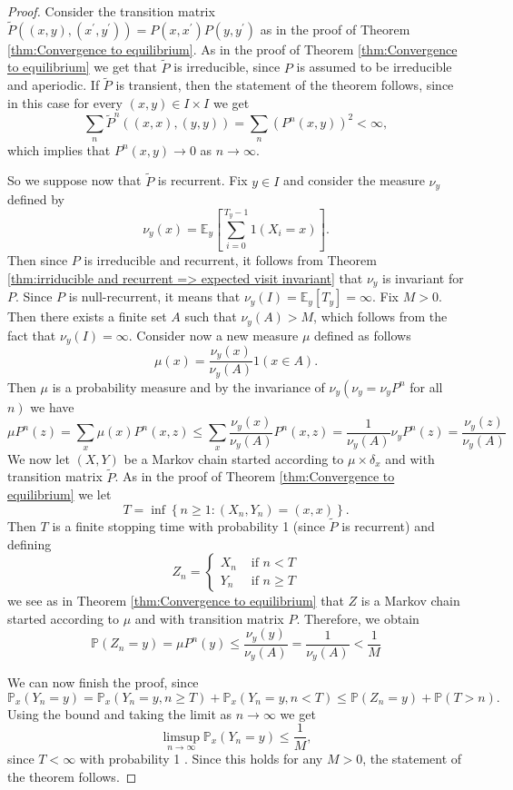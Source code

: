 \documentclass[a4paper,11pt]{article}
\begin{document}
\begin{proof}
    Consider the transition matrix $\widetilde{P}\left((x, y),\left(x^{\prime}, y^{\prime}\right)\right)=P\left(x, x^{\prime}\right) P\left(y, y^{\prime}\right)$ as in the proof of Theorem \ref{thm:Convergence to equilibrium}. As in the proof of Theorem \ref{thm:Convergence to equilibrium} we get that $\widetilde{P}$ is irreducible, since $P$ is assumed to be irreducible and aperiodic. If $\widetilde{P}$ is transient, then the statement of the theorem follows, since in this case for every $(x, y) \in I \times I$ we get
    \[
    \sum_n \widetilde{P}^n((x, x),(y, y))=\sum_n\left(P^n(x, y)\right)^2<\infty,
    \]
    which implies that $P^n(x, y) \rightarrow 0$ as $n \rightarrow \infty$.

    So we suppose now that $\widetilde{P}$ is recurrent. Fix $y \in I$ and consider the measure $\nu_y$ defined by
    \[
    \nu_y(x)=\mathbb{E}_y\left[\sum_{i=0}^{T_y-1} 1\left(X_i=x\right)\right] .
    \]
    Then since $P$ is irreducible and recurrent, it follows from Theorem \ref{thm:irriducible and recurrent => expected visit invariant} that $\nu_y$ is invariant for $P$. Since $P$ is null-recurrent, it means that $\nu_y(I)=\mathbb{E}_y\left[T_y\right]=\infty$. Fix $M>0$. Then there exists a finite set $A$ such that $\nu_y(A)>M$, which follows from the fact that $\nu_y(I)=\infty$. Consider now a new measure $\mu$ defined as follows
    \[
    \mu(x)=\frac{\nu_y(x)}{\nu_y(A)} 1(x \in A) .
    \]
    Then $\mu$ is a probability measure and by the invariance of $\nu_y\left(\nu_y=\nu_y P^n\right.$ for all $\left.n\right)$ we have
    \[
    \mu P^n(z)=\sum_x \mu(x) P^n(x, z) \leq \sum_x \frac{\nu_y(x)}{\nu_y(A)} P^n(x, z)=\frac{1}{\nu_y(A)} \nu_y P^n(z)=\frac{\nu_y(z)}{\nu_y(A)}
    \]
    We now let $(X, Y)$ be a Markov chain started according to $\mu \times \delta_x$ and with transition matrix $\widetilde{P}$. As in the proof of Theorem \ref{thm:Convergence to equilibrium} we let
    \[
    T=\inf \left\{n \geq 1:\left(X_n, Y_n\right)=(x, x)\right\} .
    \]
    Then $T$ is a finite stopping time with probability 1 (since $\widetilde{P}$ is recurrent) and defining
    \[
    Z_n=\begin{cases}
        X_n & \text { if } n<T \\
        Y_n & \text { if } n \geq T
    \end{cases} 
    \]
    we see as in Theorem \ref{thm:Convergence to equilibrium} that $Z$ is a Markov chain started according to $\mu$ and with transition matrix $P$. Therefore, we obtain
    \[
    \mathbb{P}\left(Z_n=y\right)=\mu P^n(y) \leq \frac{\nu_y(y)}{\nu_y(A)}=\frac{1}{\nu_y(A)}<\frac{1}{M}
    \]

    We can now finish the proof, since
    \[
    \mathbb{P}_x\left(Y_n=y\right)=\mathbb{P}_x\left(Y_n=y, n \geq T\right)+\mathbb{P}_x\left(Y_n=y, n<T\right) \leq \mathbb{P}\left(Z_n=y\right)+\mathbb{P}(T>n) .
    \]
    Using the bound and taking the limit as $n \rightarrow \infty$ we get
    \[
    \limsup _{n \rightarrow \infty} \mathbb{P}_x\left(Y_n=y\right) \leq \frac{1}{M},
    \]
    since $T<\infty$ with probability 1 . Since this holds for any $M>0$, the statement of the theorem follows.
\end{proof}
\end{document}
